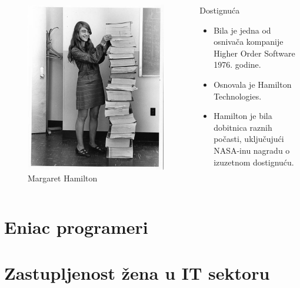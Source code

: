 \documentclass[aspectratio=169]{beamer}
\begin{document}
\begin{frame}
  
    \begin{columns}
        \begin{figure}[h]
    \centering
    \includegraphics[width = .4\textwidth]{margaret_hamilton5.jpg}
    \caption{Margaret Hamilton}
    \label{fig:my_label}
\end{figure}

        \begin{block}{Dostignuća}
            \begin{itemize}
                \item<1->Bila je jedna od osnivača kompanije Higher Order Software 1976. godine.

                \item<2->Osnovala je Hamilton Technologies.

                \item<3-> Hamilton je bila dobitnica raznih počasti, uključujući NASA-inu nagradu o izuzetnom dostignuću.
                
            \end{itemize}
        \end{block}        
    \end{columns}
   
\end{frame}


\section{Eniac programeri}



\section{Zastupljenost žena u IT sektoru}
\end{document}
